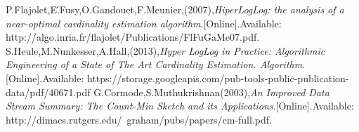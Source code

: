 \documentclass[journal]{IEEEtran}
\begin{document}
\begin{thebibliography}{3}

 P.Flajolet,E\'.Fusy,O.Gandouet,F.Meunier,(2007),\textit{HiperLogLog: the analysis of a near-optimal cardinality estimation algorithm}.[Online].Available:
http://algo.inria.fr/flajolet/Publications/FlFuGaMe07.pdf.
 S.Heule,M.Nunkesser,A.Hall,(2013),\textit{Hyper LogLog in Practice: Algorithmic Engineering of a State of The Art Cardinality Estimation. Algorithm}.[Online].Available:
https://storage.googleapis.com/pub-tools-public-publication-data/pdf/40671.pdf
 G.Cormode,S.Muthukrishnan(2003),\textit{An Improved Data Stream Summary: The Count-Min Sketch and its Applications}.[Online].Available:
http://dimacs.rutgers.edu/~graham/pubs/papers/cm-full.pdf.
\end{thebibliography}
\end{document}

